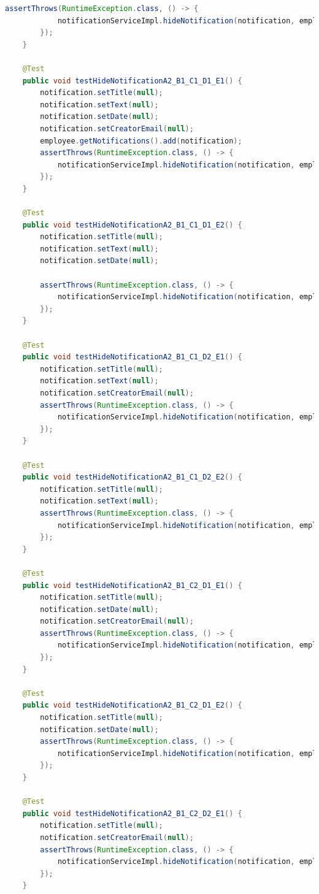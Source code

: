 \begin{lstlisting}[language=java]
        assertThrows(RuntimeException.class, () -> {
            notificationServiceImpl.hideNotification(notification, employee);
        });
    }

    @Test
    public void testHideNotificationA2_B1_C1_D1_E1() {
        notification.setTitle(null);
        notification.setText(null);
        notification.setDate(null);
        notification.setCreatorEmail(null);
        employee.getNotifications().add(notification);
        assertThrows(RuntimeException.class, () -> {
            notificationServiceImpl.hideNotification(notification, employee);
        });
    }

    @Test
    public void testHideNotificationA2_B1_C1_D1_E2() {
        notification.setTitle(null);
        notification.setText(null);
        notification.setDate(null);

        assertThrows(RuntimeException.class, () -> {
            notificationServiceImpl.hideNotification(notification, employee);
        });
    }

    @Test
    public void testHideNotificationA2_B1_C1_D2_E1() {
        notification.setTitle(null);
        notification.setText(null);
        notification.setCreatorEmail(null);
        assertThrows(RuntimeException.class, () -> {
            notificationServiceImpl.hideNotification(notification, employee);
        });
    }

    @Test
    public void testHideNotificationA2_B1_C1_D2_E2() {
        notification.setTitle(null);
        notification.setText(null);
        assertThrows(RuntimeException.class, () -> {
            notificationServiceImpl.hideNotification(notification, employee);
        });
    }

    @Test
    public void testHideNotificationA2_B1_C2_D1_E1() {
        notification.setTitle(null);
        notification.setDate(null);
        notification.setCreatorEmail(null);
        assertThrows(RuntimeException.class, () -> {
            notificationServiceImpl.hideNotification(notification, employee);
        });
    }

    @Test
    public void testHideNotificationA2_B1_C2_D1_E2() {
        notification.setTitle(null);
        notification.setDate(null);
        assertThrows(RuntimeException.class, () -> {
            notificationServiceImpl.hideNotification(notification, employee);
        });
    }

    @Test
    public void testHideNotificationA2_B1_C2_D2_E1() {
        notification.setTitle(null);
        notification.setCreatorEmail(null);
        assertThrows(RuntimeException.class, () -> {
            notificationServiceImpl.hideNotification(notification, employee);
        });
    }


\end{lstlisting}
